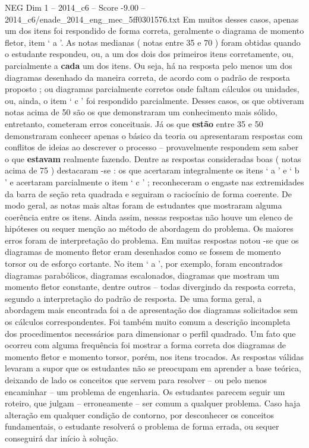 \begin{textsample}{NEG Dim 1 – 2014\_c6 – Score -9.00 – 2014\_c6/enade\_2014\_eng\_mec\_5ff0301576.txt}
Em muitos desses casos, apenas um dos itens foi respondido de forma correta, geralmente o diagrama de momento fletor, item ‘ a ’.
As notas medianas ( notas entre 35 e 70 ) foram obtidas quando o estudante respondeu, ou, a um dos dois dos primeiros itens corretamente, ou, parcialmente a \textbf{cada} um dos itens.
Ou seja, há na resposta pelo menos um dos diagramas desenhado da maneira correta, de acordo com o padrão de resposta proposto ; ou diagramas parcialmente corretos onde faltam cálculos ou unidades, ou, ainda, o item ‘ c ’ foi respondido parcialmente.
Desses casos, os que obtiveram notas acima de 50 são os que demonstraram um conhecimento mais sólido, entretanto, cometeram erros conceituais.
Já os que \textbf{estão} entre 35 e 50 demonstraram conhecer apenas o básico da teoria ou apresentaram respostas com conflitos de ideias ao descrever o processo – provavelmente respondem sem saber o que \textbf{estavam} realmente fazendo.
Dentre as respostas consideradas boas ( notas acima de 75 ) destacaram -se : os que acertaram integralmente os itens ‘ a ’ e ‘ b ’ e acertaram parcialmente o item ‘ c ’ ; reconheceram o engaste nas extremidades da barra de seção reta quadrada e seguiram o raciocínio de forma coerente.
De modo geral, as notas mais altas foram de estudantes que mostraram alguma coerência entre os itens.
Ainda assim, nessas respostas não houve um elenco de hipóteses ou sequer menção ao método de abordagem do problema.
Os maiores erros foram de interpretação do problema.
Em muitas respostas notou -se que os diagramas de momento fletor eram desenhados como se fossem de momento torsor ou de esforço cortante.
No item ‘ a ’, por exemplo, foram encontrados diagramas parabólicos, diagramas escalonados, diagramas que mostram um momento fletor constante, dentre outros – todas divergindo da resposta correta, segundo a interpretação do padrão de resposta.
De uma forma geral, a abordagem mais encontrada foi a de apresentação dos diagramas solicitados sem os cálculos correspondentes.
Foi também muito comum a descrição incompleta dos procedimentos necessários para dimensionar o perfil quadrado.
Um fato que ocorreu com alguma frequência foi mostrar a forma correta dos diagramas de momento fletor e momento torsor, porém, nos itens trocados.
As respostas válidas levaram a supor que os estudantes não se preocupam em aprender a base teórica, deixando de lado os conceitos que servem para resolver – ou pelo menos encaminhar – um problema de engenharia.
Os estudantes parecem seguir um roteiro, que julgam – erroneamente – ser comum a qualquer problema.
Caso haja alteração em qualquer condição de contorno, por desconhecer os conceitos fundamentais, o estudante resolverá o problema de forma errada, ou sequer conseguirá dar início à solução.

\end{textsample}
